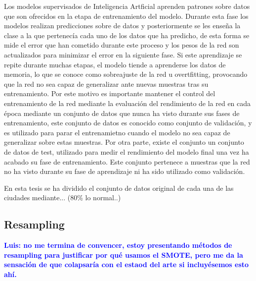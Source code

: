 \documentclass{uathesis-es}
\begin{document}
Los modelos supervisados de Inteligencia Artficial aprenden patrones sobre datos que son ofrecidos en la etapa de entrenamiento del modelo. Durante esta fase los modelos realizan predicciones sobre de datos y posteriormente se les enseña la clase a la que pertenecía cada uno de los datos que ha predicho, de esta forma se mide el error que han cometido durante este proceso y los pesos de la red son actualizados para minimizar el error en la siguiente fase. Si este aprendizaje se repite durante muchas etapas, el modelo tiende a aprenderse los datos de memoria, lo que se conoce como sobreajuste de la red u overtfitting, provocando que la red no sea capaz de generalizar ante nuevas muestras tras su entrenamiento. Por este motivo es importante mantener el control del entrenamiento de la red mediante la evaluación del rendimiento de la red en cada época mediante un conjunto de datos que nunca ha visto durante sus fases de entrenamiento, este conjunto de datos es conocido como conjunto de validación, y es utilizado para parar el entrenamietno cuando el modelo no sea capaz de generalizar sobre estas muestras. Por otra parte, existe el conjunto un conjunto de datos de test, utilizado para medir el rendimiento del modelo final una vez ha acabado su fase de entrenamiento. Este conjunto pertenece a muestras que la red no ha visto durante su fase de aprendizaje ni ha sido utilizado como validación.

En esta tesis se ha dividido el conjunto de datos original de cada una de las ciudades mediante... (80\% lo normal..)

\subsection{Resampling}

\textcolor{blue}{\textbf{Luis: no me termina de convencer, estoy presentando métodos de resampling para justificar por qué usamos el SMOTE, pero me da la sensación de que colapsaría con el estaod del arte si incluyésemos esto ahí.}}\\
\end{document}

